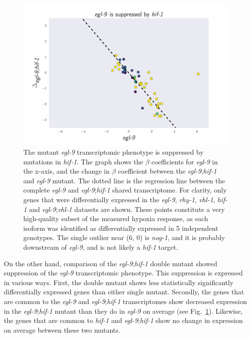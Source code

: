 \documentclass[9pt,twocolumn,twoside]{pnas-new}
\newcommand{\egl}{\emph{egl-9}}
\newcommand{\nog}{\emph{nog-1}}
\newcommand{\rhy}{\emph{rhy-1}}
\newcommand{\vhl}{\emph{vhl-1}}
\newcommand{\hif}{\emph{hif-1}}
\begin{document}
\begin{figure}[tbhp]
\centering
\includegraphics[width=\linewidth]{figs/egl9_epistatic_eglhif.pdf}
\caption{
The mutant \egl{} transcriptomic phenotype is suppressed by mutations in \hif{}.
The graph shows the $\beta$ coefficients for \egl{} in the x-axis, and the change
in $\beta$ coefficient between the \egl;\hif{} and \egl{} mutant. The dotted
line is the regression line between the complete \egl{} and \egl{};\hif{} shared
transcriptome. For clarity, only genes that were differentially expressed in the
\egl{}, \rhy{}, \vhl{}, \hif{} and \egl;\vhl{} datasets are shown. These points
constitute a very high-quality subset of the measured hypoxia response, as each
isoform was identified as differentially expressed in 5 independent genotypes.
The single outlier near (6, 0) is \nog{}, and it is probably downstream of
\egl{}, and is not likely a \hif{} target.
}
\label{fig:egl9epistasis}
\end{figure}

On the other hand, comparison of the \egl{};\hif{} double mutant showed
suppression of the \egl{} transcriptomic phenotype. This suppression is expressed
in various ways. First, the double mutant shows less statistically significantly
differentially expressed genes than either single mutant. Secondly, the genes
that are common to the \egl{} and \egl{};\hif{} transcriptomes show decreased
expression in the \egl{};\hif{} mutant than they do in \egl{} on average (see
Fig.~\ref{fig:egl9epistasis}). Likewise, the genes that are common to \hif{}
and \egl{};\hif{} show no change in expression on average between these two mutants.
\end{document}
